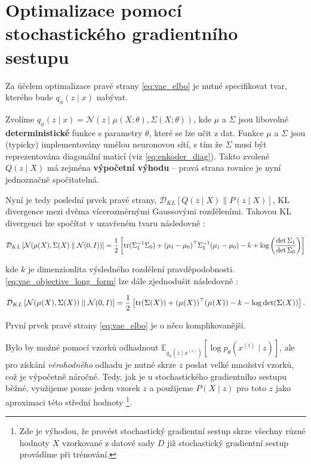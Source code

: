 \section{Optimalizace pomocí stochastického gradientního sestupu}
\label{sec:vae_optimization}

Za účelem optimalizace pravé strany \autoref{eq:vae_elbo} je nutné specifikovat tvar, kterého bude $q_\phi(z\mid x)$ nabývat.

Zvolíme $q_\phi(z\mid x) = \mathcal{N}(z\mid \mu(X;\theta),\Sigma(X;\theta))$, kde $\mu$ a $\Sigma$ jsou libovolné \textbf{deterministické} funkce s parametry $\theta$, které se lze učit z dat.
Funkce $\mu$ a $\Sigma$ jsou (typicky) implementovány umělou neuronovou sítí, s tím že $\Sigma$ musí být reprezentována diagonální maticí (viz \autoref{eq:enkoder_diag}).
Takto zvolené $Q(z\mid X)$ má zejména \textbf{výpočetní výhodu} – pravá strana rovnice je nyní jednoznačně spočitatelná. \cite{Doersch2021}

Nyní je tedy poslední prvek pravé strany, $\mathcal{D}_{KL}\left[ Q(z \mid X)\parallel P(z\mid X) \right]$, KL divergence mezi dvěma vícerozměrnými Gaussovými rozděleními.
Takovou KL divergenci lze spočítat v uzavřeném tvaru následovně \cite{Doersch2021}:

\begin{equation}\label{eq:vae_objective_long_form}
    \mathcal{D}_{KL} \left[ \mathcal{N}(\mu(X), \Sigma(X)\parallel \mathcal{N}(0, I)) \right] = 
    \frac{1}{2}\left[ \operatorname{\text{tr}} (\Sigma_1^{-1}\Sigma_0) + (\mu_1 - \mu_0)^\top \Sigma_1^{-1}(\mu_1 - \mu_0) - k + \log \left(\frac{\det \Sigma_1}{\det \Sigma_0} \right) \right]
\end{equation}

kde $k$ je dimenzionlita výsledného rozdělení pravděpodobnosti. \autoref{eq:vae_objective_long_form} lze dále zjednodušit následovně \cite{Doersch2021}:

\begin{equation}\label{eq:vae_stochastic_kl_divergence}
    \mathcal{D}_{KL} \left[ \mathcal{N}(\mu(X), \Sigma(X)) \parallel \mathcal{N}(0, I) \right] = 
    \frac{1}{2} \left[ \operatorname{\text{tr}} (\Sigma(X)) + (\mu(X))^\top (\mu(X)) - k - \log \det (\Sigma(X)) \right].
\end{equation}

První prvek pravé strany \autoref{eq:vae_elbo} je o něco komplikovanější.

Bylo by možné pomocí vzorků odhadnout $\mathds{E}_{q_\phi(z\mid x^{(i)})} \left[ \log p_\theta(x^{(i)}\mid z) \right]$, ale pro získání \emph{věrohodného} odhadu je nutné skrze $z$ poslat velké množství vzorků, což je výpočetně náročné.
Tedy, jak je u stochastického gradientního sestupu běžné, využijeme pouze jeden vzorek $z$ a použijeme $P(X\mid z)$ pro toto $z$ jako aproximaci této střední hodnoty
\footnote{Zde je výhodou, že provést stochastický gradientní sestup skrze všechny různé hodnoty $X$ vzorkované z datové sady $D$ již stochastický gradientní sestup provádíme při trénování.}. \cite{Doersch2021}


